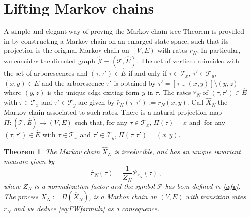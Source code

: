 \documentclass[reqno]{amsart}
\theoremstyle{plain}
\newtheorem{theorem}{Theorem}[section]
\theoremstyle{definition}
\theoremstyle{remark}
\numberwithin{equation}{section}
\numberwithin{theorem}{section}
\renewcommand{\hat}{\widehat}
\newcommand{\<}{\langle}
\renewcommand{\>}{\rangle}
\begin{document}
\section{Lifting Markov chains}\label{app:MC}
A simple and elegant way of proving the Markov chain tree Theorem is provided in \cite{AT} by constructing a Markov chain on an enlarged state space, such that its projection is the original Markov chain on $(V,E)$ with rates $r_N$. In particular, we consider the directed graph $\hat{\mathcal{G}}=(\mathcal T, \hat E)$. The set of vertices coincides with the set of arborescences and $(\tau,\tau')\in \hat E$ if and only if $\tau\in \mathcal T_x$, $\tau'\in \mathcal T_y$, $(x,y)\in E$ and the arborescence $\tau'$ is obtained by $\tau'=\left[\tau\cup (x,y)\right]\setminus (y,z)$ where $(y,z)$ is the unique edge exiting form $y$ in $\tau$. The rates $\hat r_N$ of $(\tau,\tau')\in \hat E$ with $\tau\in \mathcal T_x$ and $\tau'\in \mathcal T_y$ are given by $\hat r_N(\tau,\tau'):=r_N(x,y)$. Call $\hat X_N$ the Markov chain associated to such rates. There is a natural projection map $\Pi:(\mathcal T, \hat E) \to (V,E)$ such that, for any $\tau\in \mathcal T_x$, $\Pi(\tau)=x$ and, for any $(\tau,\tau')\in \hat E$ with $\tau\in \mathcal T_x$ and $\tau'\in \mathcal T_y$, $\Pi(\tau,\tau')=(x,y)$.
\begin{theorem}\cite{AT}
	The Markov chain $\hat X_N$ is irreducible, and has an unique invariant measure given by
	\begin{equation}\label{hat-inv}
		\hat \pi_N(\tau)=\frac{1}{Z_N}\mathcal P_{r_N}(\tau)\,,
	\end{equation}
	where $Z_N$ is a normalization factor and the symbol $\mathcal P$ has been defined in \eqref{wfw}.
	The process $X_N:=\Pi\left(\hat X_N\right)$, is a Markov chain on $(V,E)$ with transition rates $r_N$ and we deduce \eqref{eq:FWformula} as a consequence.
\end{theorem}
\end{document}
